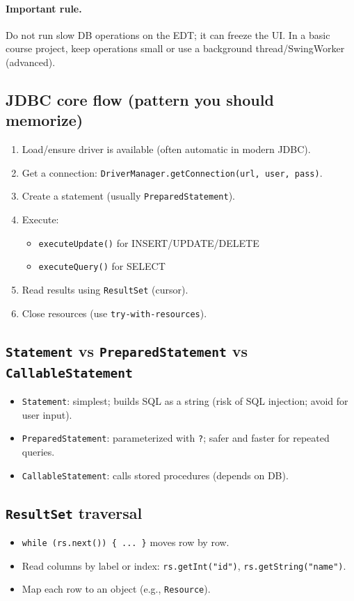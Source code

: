 \documentclass[11pt]{article}
\begin{document}
\paragraph{Important rule.} Do not run slow DB operations on the EDT; it can freeze the UI.
In a basic course project, keep operations small or use a background thread/SwingWorker (advanced).

\subsection{JDBC core flow (pattern you should memorize)}
\begin{enumerate}
  \item Load/ensure driver is available (often automatic in modern JDBC).
  \item Get a connection: \texttt{DriverManager.getConnection(url, user, pass)}.
  \item Create a statement (usually \texttt{PreparedStatement}).
  \item Execute:
  \begin{itemize}
    \item \texttt{executeUpdate()} for INSERT/UPDATE/DELETE
    \item \texttt{executeQuery()} for SELECT
  \end{itemize}
  \item Read results using \texttt{ResultSet} (cursor).
  \item Close resources (use \texttt{try-with-resources}).
\end{enumerate}

\subsection{\texttt{Statement} vs \texttt{PreparedStatement} vs \texttt{CallableStatement}}
\begin{itemize}
  \item \texttt{Statement}: simplest; builds SQL as a string (risk of SQL injection; avoid for user input).
  \item \texttt{PreparedStatement}: parameterized with \texttt{?}; safer and faster for repeated queries.
  \item \texttt{CallableStatement}: calls stored procedures (depends on DB).
\end{itemize}

\subsection{\texttt{ResultSet} traversal}
\begin{itemize}
  \item \texttt{while (rs.next()) \{ ... \}} moves row by row.
  \item Read columns by label or index: \texttt{rs.getInt("id")}, \texttt{rs.getString("name")}.
  \item Map each row to an object (e.g., \texttt{Resource}).
\end{itemize}
\end{document}
